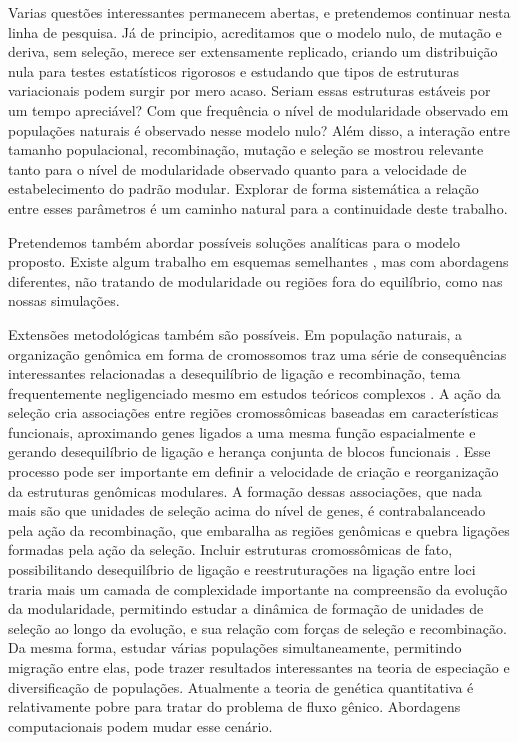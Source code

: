 Varias questões interessantes permanecem abertas, e pretendemos
continuar nesta linha de pesquisa.
Já de principio, acreditamos que o modelo nulo, de mutação e deriva, sem
seleção, merece ser extensamente replicado, criando um distribuição nula
para testes estatísticos rigorosos e estudando que tipos de estruturas
variacionais podem surgir por mero acaso.
Seriam essas estruturas estáveis por um tempo apreciável?
Com que frequência o nível de modularidade observado em populações
naturais é observado nesse modelo nulo? 
Além disso, a interação entre tamanho populacional, recombinação,
mutação e seleção se mostrou relevante tanto para o nível de
modularidade observado quanto para a velocidade de estabelecimento do
padrão modular.
Explorar de forma sistemática a relação entre esses parâmetros é um
caminho natural para a continuidade deste trabalho.

Pretendemos também abordar possíveis soluções analíticas para o modelo
proposto. 
Existe algum trabalho em esquemas semelhantes \citep{Wagner1984,
Wagner1989, Jones2007}, mas com abordagens diferentes, não tratando de
modularidade ou regiões fora do equilíbrio, como nas nossas simulações.

Extensões metodológicas também são possíveis.
Em população naturais, a organização genômica em forma de cromossomos
traz uma série de consequências interessantes relacionadas a
desequilíbrio de ligação e recombinação, tema frequentemente
negligenciado mesmo em estudos teóricos complexos \citep{Barton1987,
Turelli1994}.
A ação da seleção cria associações entre regiões
cromossômicas baseadas em características funcionais, aproximando genes
ligados a uma mesma função espacialmente e gerando desequilíbrio de
ligação e herança conjunta de blocos funcionais \citep{Templeton2003}.
Esse processo pode ser importante em definir a velocidade de criação e
reorganização da estruturas genômicas modulares.
A formação dessas associações, que nada mais são que unidades de seleção
acima do nível de genes, é contrabalanceado pela ação da recombinação,
que embaralha as regiões genômicas e quebra ligações formadas pela ação
da seleção.
Incluir estruturas cromossômicas de fato, possibilitando desequilíbrio
de ligação e reestruturações na ligação entre loci traria mais um camada
de complexidade importante na compreensão da evolução da modularidade,
permitindo estudar a dinâmica de formação de unidades de seleção
ao longo da evolução, e sua relação com forças de seleção e recombinação.
Da mesma forma, estudar várias populações simultaneamente, permitindo
migração entre elas, pode trazer resultados interessantes na teoria de
especiação e diversificação de populações.
Atualmente a teoria de genética quantitativa é relativamente pobre para
tratar do problema de fluxo gênico.
Abordagens computacionais podem mudar esse cenário.

